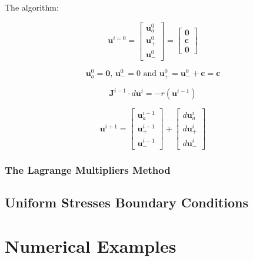 \documentclass[preprint]{elsarticle}
\begin{document}
The algorithm:

\begin{equation}
\bm{u}^{i=0} = \begin{bmatrix}\bm{u}_a^{0} \\ \bm{u}_+^{0} \\ \bm{u}_-^{0}\end{bmatrix} = \begin{bmatrix}\bm{0} \\ \bm{c} \\ \bm{0}\end{bmatrix}
\end{equation}

\begin{equation}
\bm{u}_a^{0} = \bm{0}, \, \bm{u}_-^{0} = 0 \text{ and } \bm{u}_+^{0} = \bm{u}_-^{0} + \bm{c} = \bm{c}
\end{equation}

\begin{equation}
\bm{J}^{i-1}\cdot d\bm{u}^{i}
=
-r(\bm{u}^{i-1})
\end{equation}


\begin{equation}
\bm{u}^{i+1} = 
\begin{bmatrix}\bm{u}_a^{i-1} \\ \bm{u}_+^{i-1} \\ \bm{u}_-^{i-1}\end{bmatrix} 
+ 
\begin{bmatrix} d\bm{u}_a^{i} \\ d\bm{u}_+^{i} \\ d\bm{u}_-^{i}\end{bmatrix}
\end{equation}



\subsubsection{The Lagrange Multipliers Method}

\subsection{Uniform Stresses Boundary Conditions}


\section{Numerical Examples}
\end{document}

